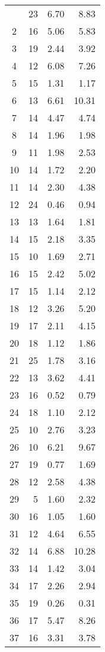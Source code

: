 \begin{longtable}{c r r r}
\endlastfoot
    1 & 23  & 6.70 & 8.83 \\ 
    2 & 16  & 5.06 & 5.83 \\ 
    3 & 19  & 2.44 & 3.92 \\ 
    4 & 12  & 6.08 & 7.26 \\ 
    5 & 15  & 1.31 & 1.17 \\ 
    6 & 13  & 6.61 & 10.31 \\ 
    7 & 14  & 4.47 & 4.74 \\ 
    8 & 14  & 1.96 & 1.98 \\ 
    9 & 11  & 1.98 & 2.53 \\ 
   10 & 14  & 1.72 & 2.20 \\ 
   11 & 14  & 2.30 & 4.38 \\ 
   12 & 24  & 0.46 & 0.94 \\ 
   13 & 13  & 1.64 & 1.81 \\ 
   14 & 15  & 2.18 & 3.35 \\ 
   15 & 10  & 1.69 & 2.71 \\ 
   16 & 15  & 2.42 & 5.02 \\ 
   17 & 15  & 1.14 & 2.12 \\ 
   18 & 12  & 3.26 & 5.20 \\ 
   19 & 17  & 2.11 & 4.15 \\ 
   20 & 18  & 1.12 & 1.86 \\ 
   21 & 25  & 1.78 & 3.16 \\ 
   22 & 13  & 3.62 & 4.41 \\ 
   23 & 16  & 0.52 & 0.79 \\ 
   24 & 18  & 1.10 & 2.12 \\ 
   25 & 10  & 2.76 & 3.23 \\ 
   26 & 10  & 6.21 & 9.67 \\ 
   27 & 19  & 0.77 & 1.69 \\ 
   28 & 12  & 2.58 & 4.38 \\ 
   29 & 5  & 1.60 & 2.32 \\ 
   30 & 16  & 1.05 & 1.60 \\ 
   31 & 12  & 4.64 & 6.55 \\ 
   32 & 14  & 6.88 & 10.28 \\ 
   33 & 14  & 1.42 & 3.04 \\ 
   34 & 17  & 2.26 & 2.94 \\ 
   35 & 19  & 0.26 & 0.31 \\ 
   36 & 17  & 5.47 & 8.26 \\ 
   37 & 16  & 3.31 & 3.78 \\ 

\end{longtable}
